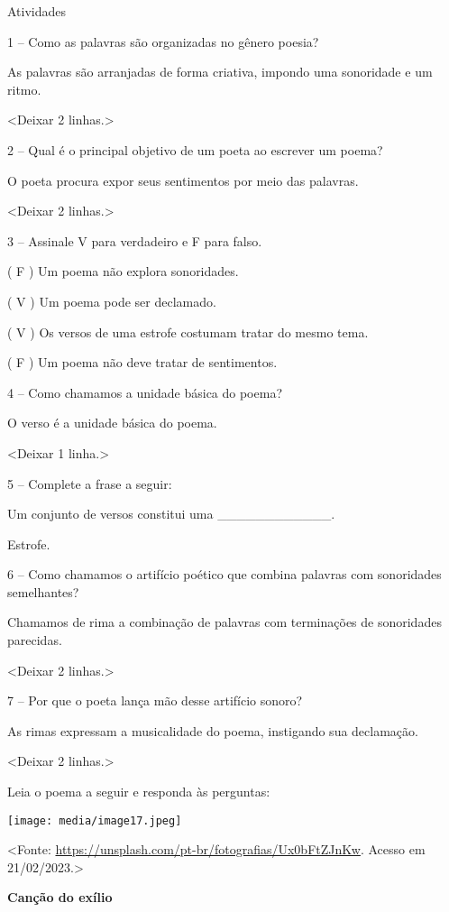 Atividades

1 -- Como as palavras são organizadas no gênero poesia?

As palavras são arranjadas de forma criativa, impondo uma sonoridade e
um ritmo.

\textless{}Deixar 2 linhas.\textgreater{}

2 -- Qual é o principal objetivo de um poeta ao escrever um poema?

O poeta procura expor seus sentimentos por meio das palavras.

\textless{}Deixar 2 linhas.\textgreater{}

3 -- Assinale V para verdadeiro e F para falso.

( F ) Um poema não explora sonoridades.

( V ) Um poema pode ser declamado.

( V ) Os versos de uma estrofe costumam tratar do mesmo tema.

( F ) Um poema não deve tratar de sentimentos.

4 -- Como chamamos a unidade básica do poema?

O verso é a unidade básica do poema.

\textless{}Deixar 1 linha.\textgreater{}

5 -- Complete a frase a seguir:

Um conjunto de versos constitui uma \_\_\_\_\_\_\_\_\_\_\_\_.

Estrofe.

6 -- Como chamamos o artifício poético que combina palavras com
sonoridades semelhantes?

Chamamos de rima a combinação de palavras com terminações de sonoridades
parecidas.

\textless{}Deixar 2 linhas.\textgreater{}

7 -- Por que o poeta lança mão desse artifício sonoro?

As rimas expressam a musicalidade do poema, instigando sua declamação.

\textless{}Deixar 2 linhas.\textgreater{}

Leia o poema a seguir e responda às perguntas:

\texttt{[image: media/image17.jpeg]}

\textless{}Fonte:
\url{https://unsplash.com/pt-br/fotografias/Ux0bFtZJnKw}. Acesso em
21/02/2023.\textgreater{}

\textbf{Canção do exílio}

